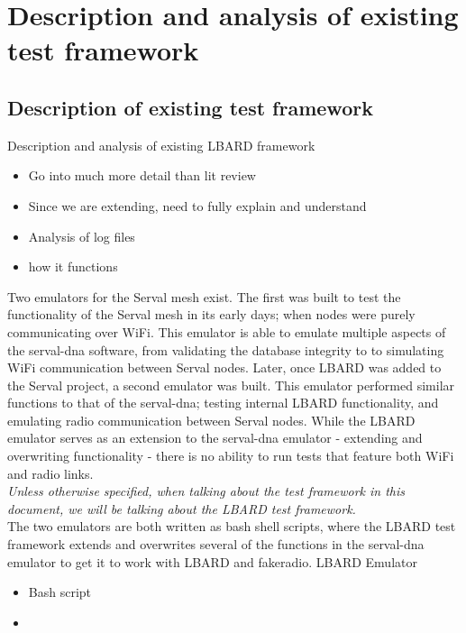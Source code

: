 \chapter{Description and analysis of existing test framework} 

\label{Chapter3} %


\section{Description of existing test framework}
Description and analysis of existing LBARD framework

\begin{itemize}
    \item Go into much more detail than lit review
    \item Since we are extending, need to fully explain and understand
    \item Analysis of log files
    \item how it functions
\end{itemize}

Two emulators for the Serval mesh exist. 
The first was built to test the functionality of the Serval mesh in its early days; when nodes were purely communicating over WiFi. 
This emulator is able to emulate multiple aspects of the serval-dna software, from validating the database integrity to  to simulating WiFi communication between Serval nodes. 
Later, once LBARD was added to the Serval project, a second emulator was built. 
This emulator performed similar functions to that of the serval-dna; testing internal LBARD functionality, and emulating radio communication between Serval nodes. 
While the LBARD emulator serves as an extension to the serval-dna emulator - extending and overwriting functionality - there is no ability to run tests that feature both WiFi and radio links.
\\
\emph{Unless otherwise specified, when talking about the test framework in this document, we will be talking about the LBARD test framework.}
\\


The two emulators are both written as bash shell scripts, where the LBARD test framework extends and overwrites several of the functions in the serval-dna emulator to get it to work with LBARD and fakeradio.
LBARD Emulator
\begin{itemize}
    \item Bash script
    \item 
\end{itemize}



